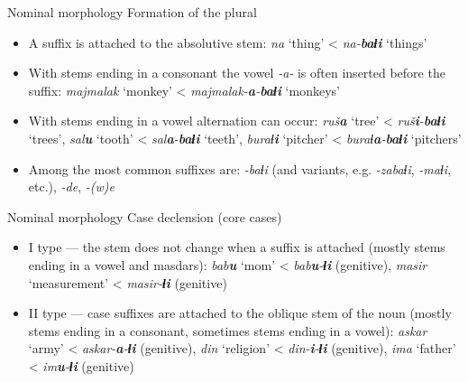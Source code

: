 \begin{frame}{Nominal morphology}
Formation of the plural
\begin{itemize}
    \item A suffix is attached to the absolutive stem: \textit{na} `thing' < \textit{na-\textbf{baɬi}} `things'
    \item With stems ending in a consonant the vowel \textit{-a-} is often inserted before the suffix: \textit{majmalak}  `monkey' < \textit{majmalak-\textbf{a}-\textbf{baɬi}} `monkeys'
    \item With stems ending in a vowel alternation can occur: \textit{ruš\textbf{a}}  `tree' < \textit{ruš\textbf{i}-\textbf{baɬi}} `trees', \textit{sal\textbf{u}}  `tooth' < \textit{sal\textbf{a}-\textbf{baɬi}} `teeth', \textit{buraɬ\textbf{i}}  `pitcher' < \textit{buraɬ\textbf{a}-\textbf{baɬi}} `pitchers'
    \item Among the most common suffixes are: \textit{-baɬi} (and variants, e.g. \textit{-zabaɬi}, \textit{-maɬi}, etc.), \textit{-de}, \textit{-(w)e}
\end{itemize}
\end{frame}

\begin{frame}{Nominal morphology}
Case declension (core cases)
\begin{itemize}
    \item I type --- the stem does not change when a suffix is attached (mostly stems ending in a vowel and masdars): \textit{bab\textbf{u}} `mom' < \textit{bab\textbf{u}-\textbf{ɬi}} (genitive), \textit{masir} `measurement' < \textit{masir-\textbf{ɬi}} (genitive)  
    \item II type --- case suffixes are attached to the oblique stem of the noun (mostly stems ending in a consonant, sometimes stems ending in a vowel): \textit{askar} `army' < \textit{askar-\textbf{a}-\textbf{ɬi}} (genitive), \textit{din} `religion' < \textit{din-\textbf{i}-\textbf{ɬi}} (genitive), \textit{ima} `father' < \textit{im\textbf{u}-\textbf{ɬi}} (genitive) 
\end{itemize}
\end{frame}

